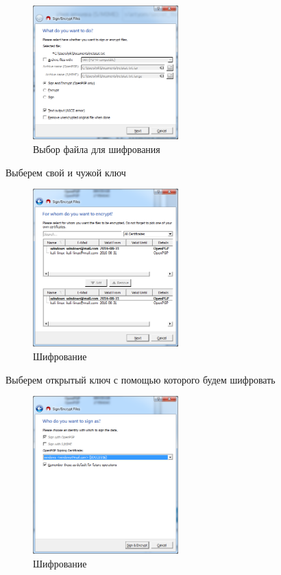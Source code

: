 \begin{figure}[!ht]
	\centering
	\includegraphics[width=0.5\textwidth]{images/10.png}
	\caption{Выбор файла для шифрования}
\end{figure}
\newpage
Выберем свой и чужой ключ
\begin{figure}[!ht]
	\centering
	\includegraphics[width=0.5\textwidth]{images/11.png}
	\caption{Шифрование}
\end{figure}
\newpage
Выберем открытый ключ с помощью которого будем шифровать
\begin{figure}[!ht]
	\centering
	\includegraphics[width=0.5\textwidth]{images/12.png}
	\caption{Шифрование}
\end{figure}

